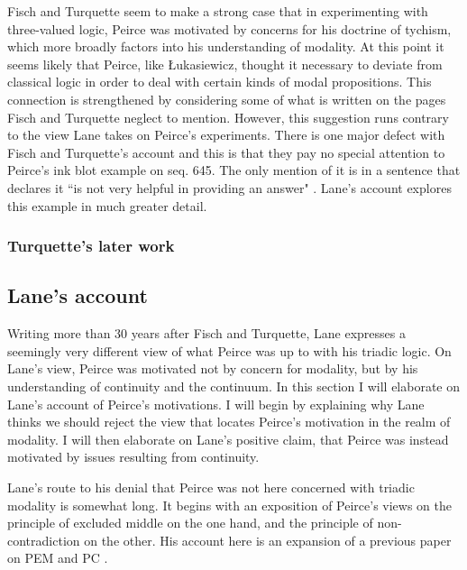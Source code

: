 \documentclass[12pt]{article}
\begin{document}
Fisch and Turquette seem to make a strong case that in experimenting with three-valued logic, Peirce was motivated by concerns for his doctrine of tychism, which more broadly factors into his understanding of modality. At this point it seems likely that Peirce, like Łukasiewicz, thought it necessary to deviate from classical logic in order to deal with certain kinds of modal propositions. This connection is strengthened by considering some of what is written on the pages Fisch and Turquette neglect to mention. However, this suggestion runs contrary to the view Lane takes on Peirce's experiments. There is one major defect with Fisch and Turquette's account and this is that they pay no special attention to Peirce's ink blot example on seq. 645. The only mention of it is in a sentence that declares it ``is not very helpful in providing an answer" \citep{fisch1966peirce}. Lane's account explores this example in much greater detail.

\subsubsection{Turquette's later work}

\subsection{Lane's account}

Writing more than 30 years after Fisch and Turquette, Lane expresses a seemingly very different view of what Peirce was up to with his triadic logic. On Lane's view, Peirce was motivated not by concern for modality, but by his understanding of continuity and the continuum. In this section I will elaborate on Lane's account of Peirce's motivations. I will begin by explaining why Lane thinks we should reject the view that locates Peirce's motivation in the realm of modality. I will then elaborate on Lane's positive claim, that Peirce was instead motivated by issues resulting from continuity.

Lane's route to his denial that Peirce was not here concerned with triadic modality is somewhat long. It begins with an exposition of Peirce's views on the principle of excluded middle on the one hand, and the principle of non-contradiction on the other. His account here is an expansion of a previous paper on PEM and PC \citep{lane1997peirce}.
\end{document}
